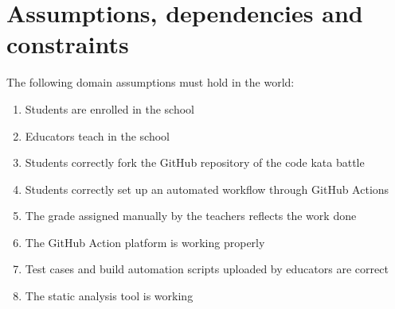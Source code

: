 \section{Assumptions, dependencies and constraints}
The following domain assumptions must hold in the world:

\begin{enumerate}[label=\textbf{D\arabic*}:,leftmargin=1.3cm]
	\item Students are enrolled in the school 
	\item Educators teach in the school
	\item Students correctly fork the GitHub repository of the code kata battle
	\item Students correctly set up an automated workflow through GitHub Actions
	\item The grade assigned manually by the teachers reflects the work done
	\item The GitHub Action platform is working properly
	\item Test cases and build automation scripts uploaded by educators are correct
	\item The static analysis tool is working
\end{enumerate}